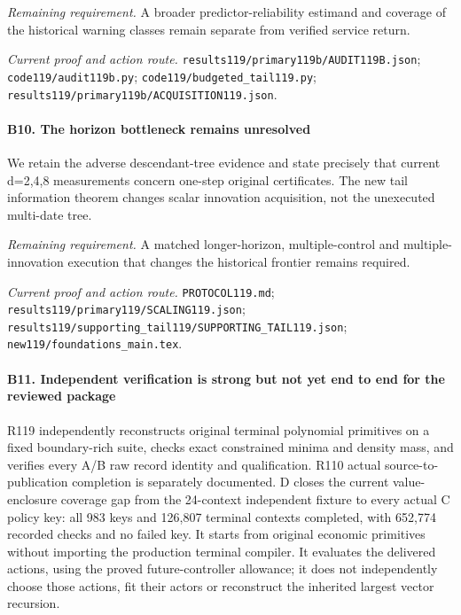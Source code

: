 \par\emph{Remaining requirement.} A broader predictor-reliability estimand and coverage of the historical warning classes remain separate from verified service return.

\par\emph{Current proof and action route.} \nolinkurl{results119/primary119b/AUDIT119B.json}; \nolinkurl{code119/audit119b.py}; \nolinkurl{code119/budgeted_tail119.py}; \nolinkurl{results119/primary119b/ACQUISITION119.json}.

\paragraph{B10. The horizon bottleneck remains unresolved}

We retain the adverse descendant-tree evidence and state precisely that current d=2,4,8 measurements concern one-step original certificates. The new tail information theorem changes scalar innovation acquisition, not the unexecuted multi-date tree.

\par\emph{Remaining requirement.} A matched longer-horizon, multiple-control and multiple-innovation execution that changes the historical frontier remains required.

\par\emph{Current proof and action route.} \nolinkurl{PROTOCOL119.md}; \nolinkurl{results119/primary119/SCALING119.json}; \nolinkurl{results119/supporting_tail119/SUPPORTING_TAIL119.json}; \nolinkurl{new119/foundations_main.tex}.

\paragraph{B11. Independent verification is strong but not yet end to end for the reviewed package}

R119 independently reconstructs original terminal polynomial primitives on a fixed boundary-rich suite, checks exact constrained minima and density mass, and verifies every A/\allowbreak{}B raw record identity and qualification. R110 actual source-to-publication completion is separately documented. D closes the current value-enclosure coverage gap from the 24-context independent fixture to every actual C policy key: all 983 keys and 126,807 terminal contexts completed, with 652,774 recorded checks and no failed key. It starts from original economic primitives without importing the production terminal compiler. It evaluates the delivered actions, using the proved future-controller allowance; it does not independently choose those actions, fit their actors or reconstruct the inherited largest vector recursion.


